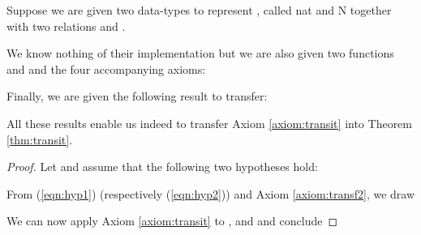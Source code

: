 \documentclass{llncs}
\begin{document}
\begin{example}
    \label{expl:natN}
    Suppose we are given two data-types to represent ,
    called nat and N together with two relations
     and .

    We know nothing of their implementation but we are also given two
    functions 
    and 
    and the four accompanying axioms:

    \begin{axiom}
        \label{axiom:surj2}
        
    \end{axiom}

    \begin{axiom}
        \label{axiom:surj1}
        
    \end{axiom}

    \begin{axiom}
        \label{axiom:transf2}
        
    \end{axiom}

    \begin{axiom}
        \label{axiom:transf1}
        
    \end{axiom}
    Finally, we are given the following result to transfer:

\setcounter{theorem}{\value{axiom}}
    \begin{axiom}[Transitivity of ]
        \label{axiom:transit}
        
    \end{axiom}
    All these results enable us indeed to transfer Axiom \ref{axiom:transit}
    into Theorem \ref{thm:transit}.

    \begin{theorem}[Transitivity of ]
        \label{thm:transit}
        
    \end{theorem}
    \begin{proof}
        Let 
        and assume that the following two hypotheses hold:
        
        
        From (\ref{eqn:hyp1}) (respectively (\ref{eqn:hyp2})) and Axiom \ref{axiom:transf2},
        we draw
        
        
        We can now apply Axiom \ref{axiom:transit}
        to ,
         and  and conclude
        

\end{proof}
\end{example}
\end{document}
